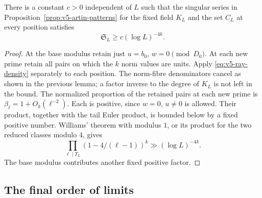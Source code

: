 \begin{proposition}\label{prop:v5-cutoff-lower}
There is a constant $c>0$ independent of $L$ such that the singular series
in Proposition~\ref{prop:v5-artin-patterns} for the fixed field $K_L$ and
the set $C_L$ at every position satisfies
\[
 \mathfrak S_L\geq c(\log L)^{-4k}.
\]
\end{proposition}
\begin{proof}
At the base modulus retain just $u=b_0$, $w=0\pmod{D_0}$.
At each new prime retain all pairs on which the $k$ norm values are units.
Apply \eqref{eq:v5-ray-density} separately to each position.
The norm-fibre denominators cancel as shown in the previous lemma; a
factor inverse to the degree of $K_L$ is not left in the bound.
The normalized proportion of the retained pairs at each new prime is
$\beta_\ell=1+O_k(\ell^{-2})$. Each is positive, since $w=0$, $u\ne0$
is allowed. Their product, together with the tail Euler product, is
bounded below by a fixed positive number. Williams' theorem with modulus
$1$, or its product for the two reduced classes modulo $4$, gives
\[
 \prod_{\ell\mid T_L}(1-4/(\ell-1))^k
       \gg(\log L)^{-4k}.
\]
The base modulus contributes another fixed positive factor.
\end{proof}

\subsection{The final order of limits}\label{subsec:v5-diagonal}

